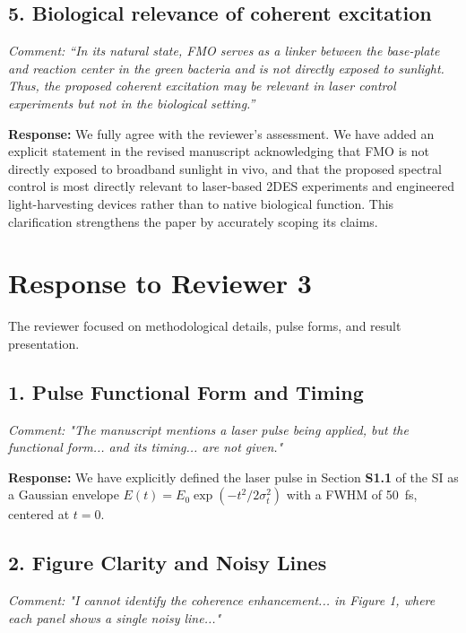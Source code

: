 \documentclass[11pt]{article}
\begin{document}
\subsection*{5. Biological relevance of coherent excitation}
\textit{Comment: ``In its natural state, FMO serves as a linker between the base-plate and reaction center in the green bacteria and is not directly exposed to sunlight. Thus, the proposed coherent excitation may be relevant in laser control experiments but not in the biological setting.''}

\textbf{Response:} We fully agree with the reviewer's assessment. We have added an explicit statement in the revised manuscript acknowledging that FMO is not directly exposed to broadband sunlight in vivo, and that the proposed spectral control is most directly relevant to laser-based 2DES experiments and engineered light-harvesting devices rather than to native biological function. This clarification strengthens the paper by accurately scoping its claims.

\vspace{2em}

\section*{Response to Reviewer 3}

The reviewer focused on methodological details, pulse forms, and result presentation.

\subsection*{1. Pulse Functional Form and Timing}
\textit{Comment: "The manuscript mentions a laser pulse being applied, but the functional form... and its timing... are not given."}

\textbf{Response:} We have explicitly defined the laser pulse in Section \textbf{S1.1} of the SI as a Gaussian envelope $E(t) = E_0 \exp(-t^2/2\sigma_t^2)$ with a FWHM of \SI{50}{\femto\second}, centered at $t=0$.

\subsection*{2. Figure Clarity and Noisy Lines}
\textit{Comment: "I cannot identify the coherence enhancement... in Figure 1, where each panel shows a single noisy line..."}
\end{document}
